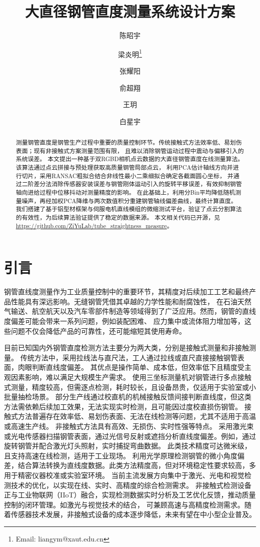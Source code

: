 \documentclass{article}
\title{大直径钢管直度测量系统设计方案}
\author{陈昭宇}
\author{梁炎明\thanks{Email: liangym@xaut.edu.cn}}
\author{张耀阳}
\author{俞超翔}
\author{王玥}
\author{白星宇}
\affil{西安理工大学}
\begin{document}
% 

\maketitle

\begin{abstract}
	测量钢管直度是钢管生产过程中重要的质量控制环节。传统接触式方法效率低、易划伤表面；现有非接触式方案测量范围有限，
    且难以消除钢管运动过程中震动与偏移引入的系统误差。
	本文提出一种基于双RGBD相机点云数据的大直径钢管直度在线测量算法。该算法通过点云拼接与预处理获取高质量钢管局部点云，
    利用PCA估计轴线方向并进行切片，采用RANSAC粗拟合结合非线性最小二乘细拟合确定各截面圆心坐标，
    并通过二阶差分法消除传感器安装误差与钢管刚体运动引入的旋转平移误差，有效抑制钢管轴向进给过程中位移抖动对测量精度的影响。
    在此基础上，利用分Bin平均降低随机测量噪声，再经加权PCA降维与两次数值积分重建钢管轴线偏差曲线，最终计算直度。
    我们搭建了基于铝型材框架与伺服电机直线模组的微缩测试平台，验证了点云分割算法的有效性，为后续算法验证提供了稳定的数据来源。
    本文相关代码已开源，见 \url{https://github.com/ZiYuLab/tube_straightness_measure}。
\end{abstract}

\section{引言}

钢管直线度测量作为工业质量控制中的重要环节，其精度对后续加工工艺和最终产品性能具有深远影响。无缝钢管凭借其卓越的力学性能和耐腐蚀性，
在石油天然气输送、航空航天以及汽车零部件制造等领域得到了广泛应用。然而，钢管的直线度偏差可能会带来一系列问题，例如装配困难、
应力集中或流体阻力增加等，这些问题不仅会降低产品的可靠性，还可能缩短其使用寿命。

目前已知国内外钢管直度检测方法主要分为两大类，分别是接触式测量和非接触测量。
传统方法中，采用拉线法与直尺法，工人通过拉线或直尺直接接触钢管表面，肉眼判断直线度偏差。
其优点是操作简单、成本低，但效率低下且精度受主观因素影响，难以满足大规模生产需求。
使用三坐标测量机对钢管进行多点接触式测量，精度较高，但需逐点检测，耗时较长，且设备昂贵，仅适用于实验室或小批量抽检场景。
部分生产线通过校直机的机械接触反馈间接判断直线度，但这类方法需依赖后续加工效果，无法实现实时检测，且可能因过度校直损伤钢管。
接触式方法普遍存在效率低、易划伤表面、无法在线检测等问题，尤其不适用于高温或高速生产线。
非接触式方法具有高效、无损伤、实时性强等特点。
采用激光束或光电传感器扫描钢管表面，通过光信号反射或遮挡分析直线度偏差。例如，通过旋转钢管并配合激光灯头照射，实时捕捉弯曲数据。
此类技术精度可达微米级，且支持高速在线检测，适用于工业现场。
利用光学原理检测钢管的微小角度偏差，结合算法转换为直线度数据。此类方法精度高，但对环境稳定性要求较高，多用于精密仪器校准或实验室环境。
当前主流发展方向集中于激光、光电和视觉检测技术的优化，以实现在线、实时、高精度的综合检测需求。
非接触式检测设备正与工业物联网（IIoT）融合，实现检测数据实时分析及工艺优化反馈，推动质量控制的闭环管理。如激光与视觉技术的结合，
可兼顾高速与高精度检测需求。随着传感器技术发展，非接触式设备的成本逐步降低，未来有望在中小型企业普及。
\end{document}
